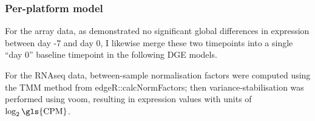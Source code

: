 

\subsubsection{Per-platform  model}

For the array data, as \autocite{sobolev2016AdjuvantedInfluenzaH1N1Vaccination} demonstrated no significant global differences in expression between day -7 and day 0, I likewise merge these two timepoints into a single \enquote{day 0} baseline timepoint in the following \gls{DGE} models.

For the \gls{RNAseq} data, between-sample normalisation factors were computed using the \gls{TMM} method\autocite{evans2018SelectingBetweensampleRNASeq} from edgeR::calcNormFactors\autocite{robinson2010EdgeRBioconductorPackage}; 
then variance-stabilisation was performed using voom\autocite{law2014VoomPrecisionWeights}, resulting in expression values with units of $\log_2{\text{\gls{CPM}}}$.

